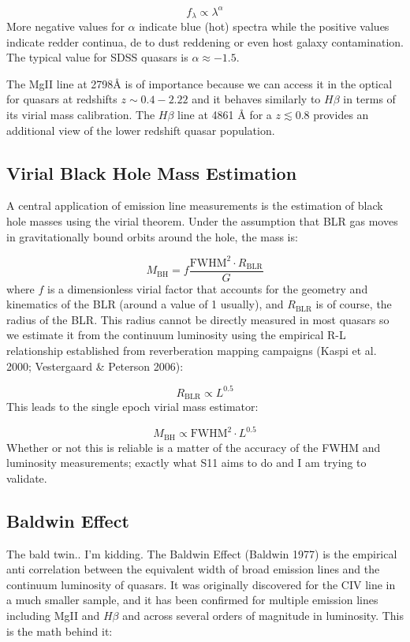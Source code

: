 \documentclass[11pt,a4paper]{article}
\begin{document}
$$f_\lambda \propto \lambda^\alpha$$
More negative values for $\alpha$ indicate blue (hot) spectra while the positive values indicate redder continua, de to dust reddening or even host galaxy contamination. The typical value for SDSS quasars is $\alpha \approx -1.5$.

The MgII line at 2798Å is of importance because we can access it in the optical for quasars at redshifts $z \sim 0.4-2.22$ and it behaves similarly to $H \beta$ in terms of its virial mass calibration. The $H \beta$ line at 4861 Å for a $z \lesssim 0.8$ provides an additional view of the lower redshift quasar population. 

\subsection{Virial Black Hole Mass Estimation}

A central application of emission line measurements is the estimation of black hole masses using the virial theorem. Under the assumption that BLR gas moves in gravitationally bound orbits around the hole, the mass is: 

$$M_\text{BH} = f \frac{\text{FWHM}^2 \cdot R_\text{BLR}}{G}$$
where $f$ is a dimensionless virial factor that accounts for the geometry and kinematics of the BLR (around a value of 1 usually), and  $R_\text{BLR}$ is of course, the radius of the BLR. This radius cannot be directly measured in most quasars so we estimate it from the continuum luminosity using the empirical R-L relationship established from reverberation mapping campaigns (Kaspi et al. 2000; Vestergaard \& Peterson 2006):

$$R_\text{BLR} \propto L^{0.5}$$
This leads to the single epoch virial mass estimator:

$$M_\text{BH} \propto \text{FWHM}^2 \cdot L^{0.5}$$
Whether or not this is reliable is a matter of the accuracy of the FWHM and luminosity measurements; exactly what S11 aims to do and I am trying to validate. 

\subsection{Baldwin Effect}
The bald twin.. I'm kidding. The Baldwin Effect (Baldwin 1977) is the empirical anti correlation between the equivalent width of broad emission lines and the continuum luminosity of quasars. It was originally discovered for the CIV line in a much smaller sample, and it has been confirmed for multiple emission lines including MgII and $H \beta$ and across several orders of magnitude in luminosity. This is the math behind it: 
\end{document}
